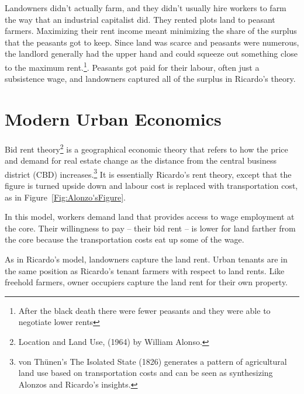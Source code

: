 Landowners didn't actually farm, and they didn't usually hire workers to farm the way that an industrial capitalist did. They rented plots land to peasant farmers.  Maximizing their rent  income meant minimizing the share of the surplus that the peasants got to keep. Since land was scarce and peasants were numerous, the landlord generally had the upper hand and could squeeze out something close to the maximum rent.\footnote{After the black death there were fewer peasants  and they were able to negotiate lower rents}. Peasants got paid for their labour, often just a subsistence wage, and landowners captured all of the surplus in Ricardo's theory.


\section{Modern Urban Economics}
Bid rent theory\footnote{Location and Land Use, (1964) by William Alonso.} is a geographical economic theory that refers to how the price and demand for real estate change as the distance from the central business district (CBD) increases.\footnote{von Th\"unen's The Isolated State (1826) generates a pattern of agricultural land use based on transportation costs and can be seen as synthesizing Alonzos and Ricardo's insights. } It is essentially Ricardo's rent theory, except that the figure is turned upside down and labour cost  is replaced with transportation cost, as in Figure~\ref{Fig:Alonzo'sFigure}. 

In this model, workers demand land that provides access to wage employment at the core. Their willingness to pay -- their bid rent -- is lower for land farther from the core because the transportation costs eat up some of the wage. 

As in Ricardo's model, landowners capture the land rent.  Urban tenants are in the same position as Ricardo's tenant farmers with respect to land rents. Like freehold farmers, owner occupiers capture the land rent  for their own property.


